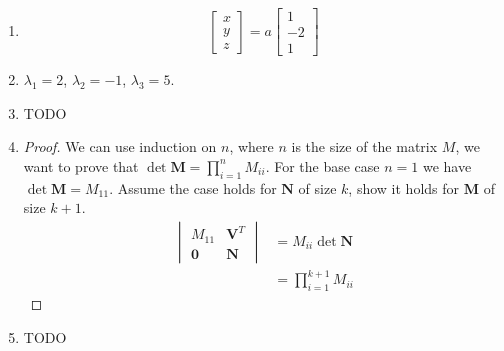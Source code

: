 \documentclass[a4paper]{report}
\newcommand{\vect}{\mathbf}
\begin{document}
\begin{enumerate}
\begin{enumerate}
	\end{enumerate}
\item
	\begin{equation*}
		\left[
		\begin{matrix}
			x\\
			y\\
			z
		\end{matrix}
		\right]
		=
		a
		\left[
		\begin{matrix}
			1\\
			-2\\
			1
		\end{matrix}
		\right]
	\end{equation*}
\item $\lambda_1=2$, $\lambda_2=-1$, $\lambda_3=5$.
\item TODO
\item \begin{proof}
		We can use induction on $n$, where $n$ is the size of the matrix $M$, we want to prove that $\det \mathbf{M} = \prod_{i=1}^{n}M_{ii}$. For the base case $n = 1$ we have $\det \mathbf{M} = M_{11}$.
		Assume the case holds for $\mathbf{N}$ of size $k$, show it holds for $\mathbf{M}$ of size $k + 1$.
		\begin{align*}
			\begin{vmatrix}
				M_{11} & \vect{V}^T\\
				\mathbf{0} & \mathbf{N}
			\end{vmatrix}
			&=
			M_{ii} \det \mathbf{N}\\
			&=
			\prod_{i=1}^{k+1}M_{ii}
		\end{align*}
\end{proof}
\item TODO
\end{enumerate}
\end{document}
